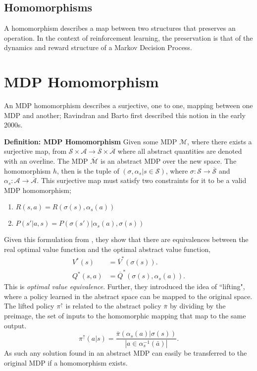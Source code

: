 \subsection{Homomorphisms}
A homomorphism describes a map between two structures that preserves an operation. In the context of reinforcement learning, the preservation is that of the dynamics and reward structure of a Markov Decision Process.

\section{MDP Homomorphism}
An MDP homomorphism describes a surjective, one to one, mapping between one MDP and another; Ravindran and Barto first described this notion in the early 2000s\cite{ravindran2003smdp,ravindran2001symmetries}.

\textbf{Definition: MDP Homomorphism} Given some MDP $\mathcal{M}$, where there exists a surjective map, from $\mathcal{S} \times \mathcal{A} \rightarrow \overline{\mathcal{S}} \times \overline{\mathcal{A}}$ where all abstract quantities are denoted with an $\overline{\text{overline}}$. The MDP $\overline{\mathcal{M}}$  is an abstract MDP over the new space. The homomorphism $h$, then is the tuple of $(\sigma, \alpha_s|s \in \mathcal{S})$, where $\sigma: \mathcal{S} \rightarrow \overline{\mathcal{S}}$ and $\alpha_s : \mathcal{A} \rightarrow \overline{\mathcal{A}}$. This surjective map must satisfy two constraints for it to be a valid MDP homomorphism;
\begin{enumerate}
	\item $R(s, a) = R(\sigma(s), \alpha_s(a))$
	\item $P(s'| a, s) = P(\sigma(s')| \alpha_s(a), \sigma(s))$
\end{enumerate}

Given this formulation from \cite{vanderpol2020mdp}, they show that there are equivalences between the real optimal value function and the optimal abstract value function,
\begin{align*}
	V^*(s)    & = \overline{V}^*(\sigma(s)).              \\
	Q^*(s, a) & = \overline{Q}^*(\sigma(s), \alpha_s(a)).
\end{align*}
This is \textit{optimal value equivalence}. Further, they introduced the idea of ``lifting", where a policy learned in the abstract space can be mapped to the original space. The lifted policy $\pi^\uparrow$ is related to the abstract policy $\overline{\pi}$ by dividing by the preimage, the set of inputs to the homomorphic mapping that map to the same output.
\begin{equation}
	\pi^\uparrow(a | s) = \frac{\overline{\pi}(\alpha_s(a) | \sigma(s))}{| a \in \alpha^{-1}_s(\bar{a})|}.
\end{equation}
As such any solution found in an abstract MDP can easily be transferred to the original MDP if a homomorphism exists.

